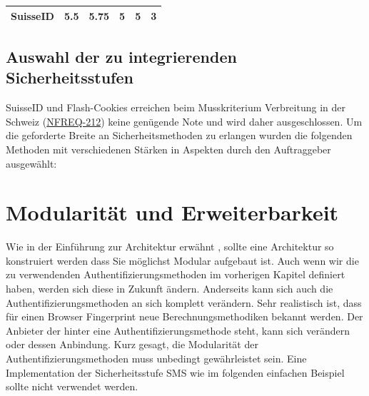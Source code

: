 \begin{longtable}[c]{@{}lllllc@{}}
\begin{minipage}[t]{0.19\columnwidth}
\textbf{SuisseID}
\strut\end{minipage} &
\begin{minipage}[t]{0.13\columnwidth}\raggedright\strut
5.5
\strut\end{minipage} &
\begin{minipage}[t]{0.13\columnwidth}\raggedright\strut
5.75
\strut\end{minipage} &
\begin{minipage}[t]{0.11\columnwidth}\raggedright\strut
5
\strut\end{minipage} &
\begin{minipage}[t]{0.13\columnwidth}\raggedright\strut
5
\strut\end{minipage} &
\begin{minipage}[t]{0.13\columnwidth}\centering\strut
3
\strut\end{minipage}\tabularnewline
\bottomrule
\end{longtable}

\subsection{Auswahl der zu integrierenden
Sicherheitsstufen}\label{auswahl-der-zu-integrierenden-sicherheitsstufen}

SuisseID und Flash-Cookies erreichen beim Musskriterium Verbreitung in
der Schweiz (\protect\hyperlink{ux5cux23ux5cux23NFREQ-212}{NFREQ-212})
keine genügende Note und wird daher ausgeschlossen. Um die geforderte
Breite an Sicherheitsmethoden zu erlangen wurden die folgenden Methoden
mit verschiedenen Stärken in Aspekten durch den Auftraggeber ausgewählt:

\newpage

\hypertarget{modularituxe4t-und-erweiterbarkeit}{\section{Modularität
und Erweiterbarkeit}\label{modularituxe4t-und-erweiterbarkeit}}

Wie in der Einführung zur Architektur erwähnt , sollte eine Architektur
so konstruiert werden dass Sie möglichst Modular aufgebaut ist. Auch
wenn wir die zu verwendenden Authentifizierungsmethoden im vorherigen
Kapitel definiert haben, werden sich diese in Zukunft ändern. Anderseits
kann sich auch die Authentifizierungsmethoden an sich komplett
verändern. Sehr realistisch ist, dass für einen Browser Fingerprint neue
Berechnungsmethodiken bekannt werden. Der Anbieter der hinter eine
Authentifizierungsmethode steht, kann sich verändern oder dessen
Anbindung. Kurz gesagt, die Modularität der Authentifizierungsmethoden
muss unbedingt gewährleistet sein. Eine Implementation der
Sicherheitsstufe SMS wie im folgenden einfachen Beispiel sollte nicht
verwendet werden.

